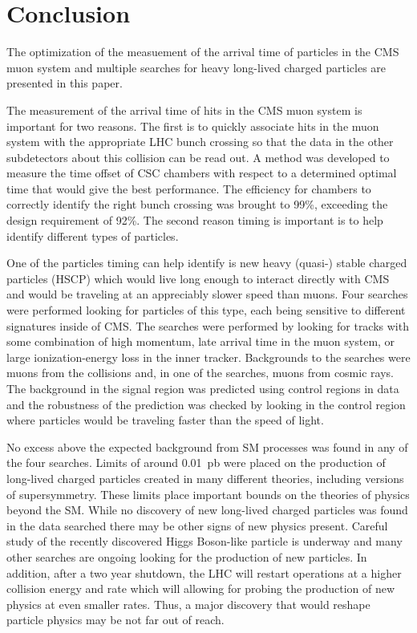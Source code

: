 \chapter{Conclusion \label{sec:conclusion}}
The optimization of the measuement of the arrival time of particles in the CMS muon system and multiple searches for heavy long-lived charged particles
are presented in this paper.

The measurement of the arrival time of hits in the CMS muon system is important for two reasons.
The first is to quickly associate hits in the muon system with the appropriate LHC bunch crossing so that the data in the other subdetectors about this
collision can be read out. A method was developed to measure the time offset of CSC chambers with respect to a determined optimal time that would give
the best performance. 
The efficiency for chambers to correctly identify the right bunch crossing was brought to 99\%,
exceeding the design requirement of 92\%. The second reason timing is important is to help identify different types of particles.

One of the particles timing can help identify is new heavy (quasi-) stable charged particles (HSCP) which would live long enough to interact directly with CMS
and would be traveling at an appreciably slower speed than muons. Four searches were performed looking
for particles of this type, each being sensitive to different signatures inside of CMS. 
The searches were performed by looking for tracks with some combination of high momentum, late arrival time in the muon system,
or large ionization-energy loss in the inner tracker.
Backgrounds to the searches were muons from the collisions and, in one of the searches, muons from cosmic rays.
The background in the signal region was predicted using control regions in data and the 
robustness of the prediction was checked by looking in the control region where particles would be traveling faster than the speed of light.

No excess above the expected background from SM processes was found in any of the four searches. Limits of around 0.01~pb were placed on the production of long-lived charged
particles created in many different theories, including versions of supersymmetry. These limits place important bounds on the theories
of physics beyond the SM. While no discovery of new long-lived charged particles was found in the data searched there may be other signs of
new physics present. Careful study of the recently discovered Higgs Boson-like particle is underway and many other searches are ongoing looking for the production
of new particles. In addition, after a two year shutdown, the LHC will restart operations at a higher collision energy and rate which will allowing for probing
the production of new physics at even smaller rates. 
Thus, a major discovery that would reshape particle physics may be not far out of reach.
